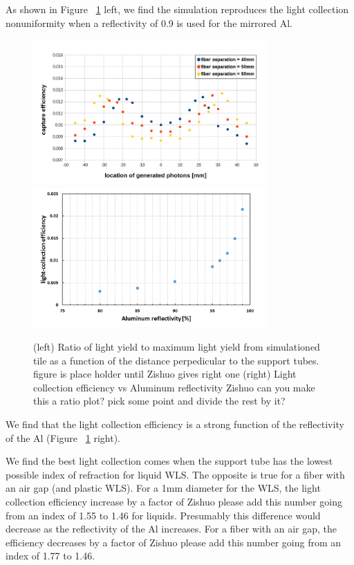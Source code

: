 \documentclass[review]{elsarticle}
\begin{document}
As shown in Figure ~\ref{fig:simeff} left, we find the simulation
reproduces the light collection nonuniformity when a reflectivity of
0.9 is used for the mirrored Al.

\begin{figure}[!ht]
\begin{center}
\includegraphics[width=0.8\textwidth]{./figures/geant_result_uniformity.png}
\includegraphics[width=0.8\textwidth]{./figures/geant_result_reflectivity.png}
\caption{(left) Ratio of light yield to maximum light yield from
  simulationed tile as a function of the distance perpedicular to the
  support tubes. {\color{red} figure is place holder until Zishuo
    gives right one} (right) Light collection efficiency vs Aluminum
  reflectivity {\color{red} Zishuo can you make this a ratio plot?
    pick some point and divide the rest by it?}  }
\label{fig:simeff}
\end{center}
\end{figure}


We find that the light collection efficiency is a strong function of
the reflectivity of the Al (Figure ~\ref{fig:simeff} right).


We find the best light collection comes when the support tube has the
lowest possible index of refraction for liquid WLS.  The opposite is
true for a fiber with an air gap (and plastic WLS).  For a 1mm
diameter for the WLS, the light collection efficiency increase by a
factor of {\color{red} Zishuo please add this number} going from an
index of 1.55 to 1.46 for liquids.  Presumably this difference would
decrease as the reflectivity of the Al increases. For a fiber with an
air gap, the efficiency decreases by a factor of {\color{red} Zishuo
  please add this number} going from an index of 1.77 to 1.46.
\end{document}

